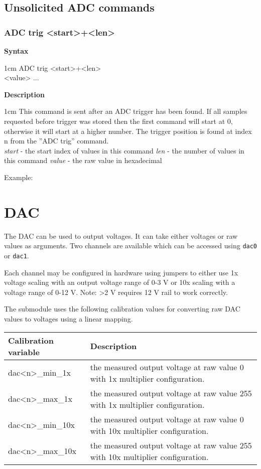 \documentclass{article}[a4paper]
\begin{document}
\subsection{Unsolicited ADC commands}

\subsubsection{ADC trig <start>+<len>}
\begin{tcolorbox}
	{\bf Syntax}

	 1cm \dimexpr\linewidth-2cm\relax
	ADC trig <start>+<len> \\
	<value> ...

	\medskip
	{\bf Description}

	 1cm \dimexpr\linewidth-2cm\relax
	This command is sent after an ADC trigger has been found. If all samples
	requested before trigger was stored then the first command will start at 0,
	otherwise it will start at a higher number. The trigger position is found at
	index n from the ''ADC trig'' command.
	\medskip \\
	{\it start} - the start index of values in this command
	{\it len} - the number of values in this command
	{\it value} - the raw value in hexadecimal

	\medskip
	Example: \texttt{}
\end{tcolorbox}

\section{DAC}

The DAC can be used to output voltages. It can take either voltages or raw
values as arguments. Two channels are available
which can be accessed using \texttt{dac0} or \texttt{dac1}.

Each channel may be configured in hardware using jumpers to either use 1x
voltage scaling with an output voltage range of 0-3 V or 10x scaling with a
voltage range of 0-12 V. Note: >2 V requires 12 V rail to work correctly.

The submodule uses the following calibration values for converting raw DAC values to
voltages using a linear mapping.

\medskip

\noindent
\begin{tabularx}{\textwidth}{|p{4cm}|X|}
\hline
Calibration variable & Description \\
\hline
dac<n>\_min\_1x & the measured output voltage at raw value 0 with 1x multiplier
configuration. \\
\hline
dac<n>\_max\_1x & the measured output voltage at raw value 255 with 1x multiplier
configuration. \\
\hline
dac<n>\_min\_10x & the measured output voltage at raw value 0 with 10x multiplier
configuration. \\
\hline
dac<n>\_max\_10x & the measured output voltage at raw value 255 with 10x multiplier
configuration. \\
\hline
\end{tabularx}
\end{document}

